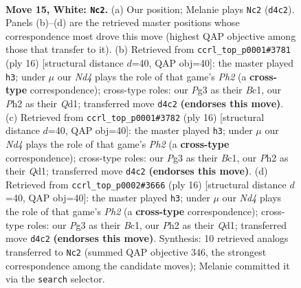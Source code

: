 \documentclass[11pt]{article}
\begin{document}
\begin{figure}[p]\centering
\begin{subfigure}{0.46\textwidth}\centering
\resizebox{\linewidth}{!}{%
\newchessgame
\chessboard[
  setfen={r1bq1rk1/2pn1pb1/1p1p1np1/3P3p/p1PNp3/2N3PB/PP1QPP1P/1RB2RK1 w - - 2 15},
  showmover=false,
  pgfstyle=straightmove, color=movearrow, markmove={d4-c2}
]}
\caption{}
\end{subfigure}\hfill
\begin{subfigure}{0.46\textwidth}\centering
\resizebox{\linewidth}{!}{%
\newchessgame
\chessboard[
  setfen={r1bq1rk1/pp1n1pbp/2pp1np1/4p3/2PPP3/2N2NP1/PP3PBP/R1BQ1RK1 w - - 0 9},
  showmover=false,
  pgfstyle=straightmove, color=movearrow, markmove={h2-h3}
]}
\caption{}
\end{subfigure}
\\[4pt]
\begin{subfigure}{0.46\textwidth}\centering
\resizebox{\linewidth}{!}{%
\newchessgame
\chessboard[
  setfen={r1bq1rk1/pp1n1pbp/2pp1np1/4p3/2PPP3/2N2NP1/PP3PBP/R1BQ1RK1 w - - 0 9},
  showmover=false,
  pgfstyle=straightmove, color=movearrow, markmove={h2-h3}
]}
\caption{}
\end{subfigure}\hfill
\begin{subfigure}{0.46\textwidth}\centering
\resizebox{\linewidth}{!}{%
\newchessgame
\chessboard[
  setfen={r1bq1rk1/pp1n1pbp/2pp1np1/4p3/2PPP3/2N2NP1/PP3PBP/R1BQ1RK1 w - - 0 9},
  showmover=false,
  pgfstyle=straightmove, color=movearrow, markmove={h2-h3}
]}
\caption{}
\end{subfigure}
\caption{\textbf{Move 15, White: \texttt{Nc2}.} (a) Our position; Melanie plays \texttt{Nc2} (\texttt{d4c2}). Panels (b)--(d) are the retrieved master positions whose correspondence most drove this move (highest QAP objective among those that transfer to it). (b) Retrieved from \texttt{ccrl\_top\_p0001\#3781} (ply 16) [structural distance $d$=40, QAP obj=40]: the master played \texttt{h3}; under $\mu$ our \emph{Nd4} plays the role of that game's \emph{Ph2} (a \textbf{cross-type} correspondence); cross-type roles: our \emph{P}g3 as their \emph{B}c1, our \emph{P}h2 as their \emph{Q}d1; transferred move \texttt{d4c2} \textbf{(endorses this move)}. (c) Retrieved from \texttt{ccrl\_top\_p0001\#3782} (ply 16) [structural distance $d$=40, QAP obj=40]: the master played \texttt{h3}; under $\mu$ our \emph{Nd4} plays the role of that game's \emph{Ph2} (a \textbf{cross-type} correspondence); cross-type roles: our \emph{P}g3 as their \emph{B}c1, our \emph{P}h2 as their \emph{Q}d1; transferred move \texttt{d4c2} \textbf{(endorses this move)}. (d) Retrieved from \texttt{ccrl\_top\_p0002\#3666} (ply 16) [structural distance $d$=40, QAP obj=40]: the master played \texttt{h3}; under $\mu$ our \emph{Nd4} plays the role of that game's \emph{Ph2} (a \textbf{cross-type} correspondence); cross-type roles: our \emph{P}g3 as their \emph{B}c1, our \emph{P}h2 as their \emph{Q}d1; transferred move \texttt{d4c2} \textbf{(endorses this move)}. Synthesis: 10 retrieved analogs transferred to \texttt{Nc2} (summed QAP objective 346, the strongest correspondence among the candidate moves); Melanie committed it via the \texttt{search} selector.}
\label{fig:thought-m28}
\end{figure}
\end{document}
